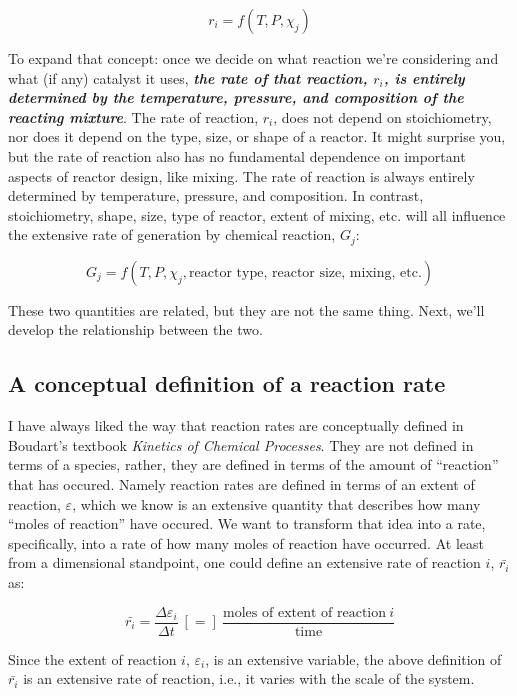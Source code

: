 \documentclass[11pt]{article}
\begin{document}
\[r_i = f(T, P, \chi_j)\]

To expand that concept: once we decide on what reaction we're
considering and what (if any) catalyst it uses, \textbf{\emph{the rate
of that reaction, \(r_i\), is entirely determined by the temperature,
pressure, and composition of the reacting mixture}}. The rate of
reaction, \(r_i\), does not depend on stoichiometry, nor does it depend
on the type, size, or shape of a reactor. It might surprise you, but the
rate of reaction also has no fundamental dependence on important aspects
of reactor design, like mixing. The rate of reaction is always entirely
determined by temperature, pressure, and composition. In contrast,
stoichiometry, shape, size, type of reactor, extent of mixing, etc. will
all influence the extensive rate of generation by chemical reaction,
\(G_j\):

\[G_j = f(T, P, \chi_j, \text{reactor type, reactor size, mixing, etc.})\]

These two quantities are related, but they are not the same thing. Next,
we'll develop the relationship between the two.

    \hypertarget{a-conceptual-definition-of-a-reaction-rate}{%
\subsection{A conceptual definition of a reaction
rate}\label{a-conceptual-definition-of-a-reaction-rate}}

I have always liked the way that reaction rates are conceptually defined
in Boudart's textbook \emph{Kinetics of Chemical Processes}. They are
not defined in terms of a species, rather, they are defined in terms of
the amount of ``reaction'' that has occured. Namely reaction rates are
defined in terms of an extent of reaction, \(\varepsilon\), which we
know is an extensive quantity that describes how many ``moles of
reaction'' have occured. We want to transform that idea into a rate,
specifically, into a rate of how many moles of reaction have occurred.
At least from a dimensional standpoint, one could define an extensive
rate of reaction \(i\), \(\bar{r_i}\) as:

\[\bar{r_i} = \frac{\Delta \varepsilon_i}{\Delta t} \ [=] \ \frac{\text{moles of extent of reaction} \ i}{\text{time}}\]

Since the extent of reaction \(i\), \(\varepsilon_i\), is an extensive
variable, the above definition of \(\bar{r_i}\) is an extensive rate of
reaction, i.e., it varies with the scale of the system.
\end{document}
